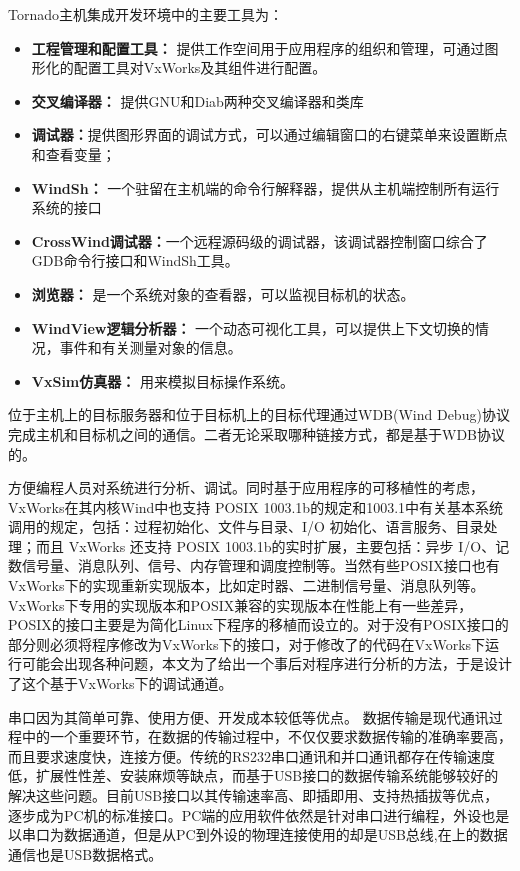 {Tornado主机集成开发环境中的主要工具为：
\begin{itemize}
\item \textbf{工程管理和配置工具：} 提供工作空间用于应用程序的组织和管理，可通过图形化的配置工具对VxWorks及其组件进行配置。
\item \textbf{交叉编译器：} 提供GNU和Diab两种交叉编译器和类库
\item \textbf{调试器：}提供图形界面的调试方式，可以通过编辑窗口的右键菜单来设置断点和查看变量；
\item \textbf{WindSh：} 一个驻留在主机端的命令行解释器，提供从主机端控制所有运行系统的接口
\item \textbf{CrossWind调试器：}一个远程源码级的调试器，该调试器控制窗口综合了GDB命令行接口和WindSh工具。
\item \textbf{浏览器：} 是一个系统对象的查看器，可以监视目标机的状态。
\item \textbf{WindView逻辑分析器：} 一个动态可视化工具，可以提供上下文切换的情况，事件和有关测量对象的信息。
\item \textbf{VxSim仿真器：} 用来模拟目标操作系统。
\end{itemize}

	位于主机上的目标服务器和位于目标机上的目标代理通过WDB(Wind Debug)协议完成主机和目标机之间的通信。二者无论采取哪种链接方式，都是基于WDB协议的。

	
		
	方便编程人员对系统进行分析、调试。同时基于应用程序的可移植性的考虑，VxWorks在其内核Wind中也支持 POSIX 1003.1b的规定和1003.1中有关基本系统调用的规定，包括：过程初始化、文件与目录、I/O 初始化、语言服务、目录处理；而且 VxWorks 还支持 POSIX 1003.1b的实时扩展，主要包括：异步 I/O、记数信号量、消息队列、信号、内存管理和调度控制等\cite{Wind2003VxWorks}。当然有些POSIX接口也有VxWorks下的实现重新实现版本，比如定时器、二进制信号量、消息队列等。VxWorks下专用的实现版本和POSIX兼容的实现版本在性能上有一些差异，POSIX的接口主要是为简化Linux下程序的移植而设立的。对于没有POSIX接口的部分则必须将程序修改为VxWorks下的接口，对于修改了的代码在VxWorks下运行可能会出现各种问题，本文为了给出一个事后对程序进行分析的方法，于是设计了这个基于VxWorks下的调试通道。



	串口因为其简单可靠、使用方便、开发成本较低等优点\cite{串口调试}。 数据传输是现代通讯过程中的一个重要环节，在数据的传输过程中，不仅仅要求数据传输的准确率要高，而且要求速度快，连接方便。传统的RS232串口通讯和并口通讯都存在传输速度低，扩展性性差、安装麻烦等缺点，而基于USB接口的数据传输系统能够较好的解决这些问题。目前USB接口以其传输速率高、即插即用、支持热插拔等优点，逐步成为PC机的标准接口。PC端的应用软件依然是针对串口进行编程，外设也是以串口为数据通道，但是从PC到外设的物理连接使用的却是USB总线,在上的数据通信也是USB数据格式。

}
